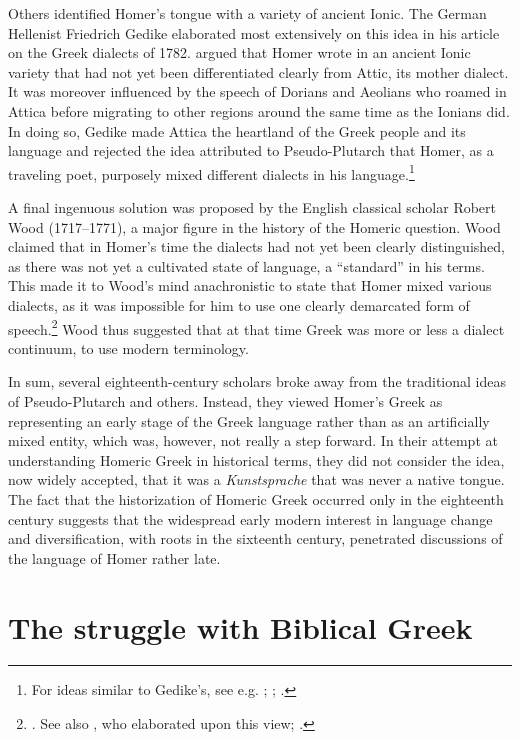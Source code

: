 Others identified Homer’s tongue with a variety of ancient Ionic. The German Hellenist Friedrich Gedike elaborated most extensively on this idea in his article on the Greek dialects of 1782. \citet[22--23]{Gedike1782} argued that Homer wrote in an ancient Ionic variety that had not yet been differentiated clearly from Attic, its mother dialect. It was moreover influenced by the speech of Dorians and Aeolians who roamed in Attica before migrating to other regions around the same time as the Ionians did. In doing so, Gedike made Attica the heartland of the Greek people and its language and rejected the idea attributed to Pseudo-Plutarch that Homer, as a traveling poet, purposely mixed different dialects in his language.\footnote{For ideas similar to Gedike’s, see e.g. \citet[115--116]{Freret1809}; \citet[202]{Beattie1778}; \citet[175--176]{Trendelenburg1782}.}

A final ingenuous solution was proposed by the English classical scholar Robert Wood (1717–1771), a major figure in the history of the Homeric question. Wood claimed that in Homer’s time the dialects had not yet been clearly distinguished, as there was not yet a cultivated state of language, a “standard” in his terms. This made it to Wood’s mind anachronistic to state that Homer mixed various dialects, as it was impossible for him to use one clearly demarcated form of speech.\footnote{\citet[238]{Wood1775}. See also \citet[\textsc{xxiiii–xxv}]{Harles1778}, who elaborated upon this view; \citet[\textsc{v}]{Facius1782}.} Wood thus suggested that at that time Greek was more or less a dialect continuum, to use modern terminology.

In sum, several eighteenth-century scholars broke away from the traditional ideas of Pseudo-Plutarch and others. Instead, they viewed Homer’s Greek as representing an early stage of the Greek language rather than as an artificially mixed entity, which was, however, not really a step forward. In their attempt at understanding Homeric Greek in historical terms, they did not consider the idea, now widely accepted, that it was a \textit{Kunstsprache} that was never a native tongue. The fact that the historization of Homeric Greek occurred only in the eighteenth century suggests that the widespread early modern interest in language change and diversification, with roots in the sixteenth century, penetrated discussions of the language of Homer rather late.

\section{The struggle with Biblical Greek}\label{sec:4.4}

